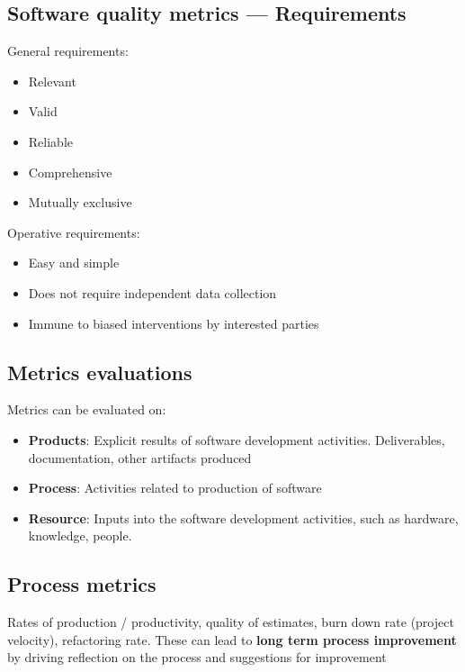 \documentclass{article}
\begin{document}
\subsection{Software quality metrics — Requirements}

\begin{flushleft}
General	requirements:
\begin{itemize}
  \item Relevant
  \item Valid
  \item Reliable
  \item Comprehensive 
  \item Mutually exclusive
\end{itemize}
Operative requirements:
\begin{itemize}
  \item Easy and simple 
  \item Does not require independent data collection 
  \item Immune to biased interventions by interested parties
\end{itemize}
\end{flushleft}

\subsection{Metrics evaluations}

\begin{flushleft}
Metrics can be evaluated on:
\begin{itemize}
  \item \textbf{Products}: Explicit results of software development activities. Deliverables, documentation, other artifacts produced
  \item \textbf{Process}: Activities	related	to	production	of	software
  \item \textbf{Resource}: Inputs into the software development activities, such as hardware, knowledge, people.
\end{itemize}
\end{flushleft}

\subsection{Process metrics}

\begin{flushleft}
Rates of production / productivity, quality of estimates, burn down rate (project velocity), refactoring rate. These can lead to \textbf{long term process improvement} by driving reflection on the process and suggestions for improvement
\end{flushleft}
\end{document}
